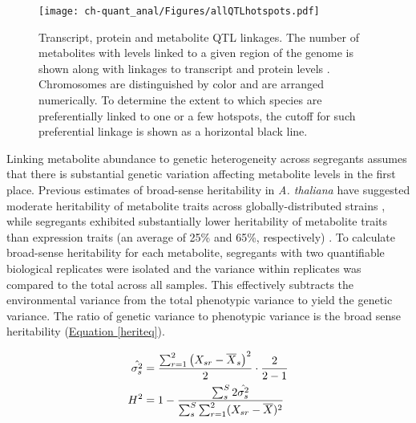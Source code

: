 \begin{figure}[h!]
\begin{center}
\texttt{[image: ch-quant\_anal/Figures/allQTLhotspots.pdf]}
\caption[Transcript, protein and metabolite QTL linkages]{Transcript, protein and metabolite QTL linkages. The number of metabolites with levels linked to a given region of the genome is shown along with linkages to transcript and protein levels \cite{Brem:2005gh, Foss:2007ej}. Chromosomes are distinguished by color and are arranged numerically. To determine the extent to which species are preferentially linked to one or a few hotspots, the cutoff for such preferential linkage is shown as a horizontal black line.}
\label{ch-quant_anal:qtlHotspots}
\end{center}
\end{figure}

Linking metabolite abundance to genetic heterogeneity across segregants assumes that there is substantial genetic variation affecting metabolite levels in the first place.  Previous estimates of broad-sense heritability \cite{Lynch:1998vx} in \textit{A. thaliana} have suggested moderate heritability of metabolite traits across globally-distributed strains \cite{Keurentjes:2006ik}, while segregants exhibited substantially lower heritability of metabolite traits than expression traits (an average of 25\% and 65\%, respectively) \cite{Rowe:2008ty, West:2006bk}.  To calculate broad-sense heritability for each metabolite, segregants with two quantifiable biological replicates were isolated and the variance within replicates was compared to the total across all samples.  This effectively subtracts the environmental variance from the total phenotypic variance to yield the genetic variance.  The ratio of genetic variance to phenotypic variance is the broad sense heritability (\hyperref[heriteq]{Equation \ref{heriteq}}).

\large{
\begin{align}
\hat{\sigma^{2}_{s}} &= \frac{\sum_{r = 1}^{2}\left(X_{sr} - \overline{X}_{s}\right)^2}{2} \cdot \frac{2}{2 - 1}\notag\\
H^{2} &= 1 -  \frac{\sum_{s}^{S}2\hat{\sigma^{2}_{s}}}{\sum_{s}^{S}\sum_{r = 1}^{2}(X_{sr} - \overline{X})^2}\label{heriteq}
\end{align}
}

